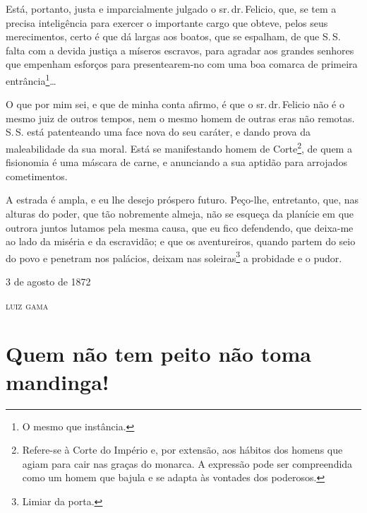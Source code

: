 Está, portanto, justa e imparcialmente julgado o sr.\,dr.\,Felicio, que,
se tem a precisa inteligência para exercer o importante cargo que
obteve, pelos seus merecimentos, certo é que dá largas aos boatos, que
se espalham, de que S.\,S. falta com a devida justiça a míseros escravos,
para agradar aos grandes senhores que empenham esforços para
presentearem-no com uma boa comarca de primeira entrância\footnote{ O
  mesmo que instância.}\ldots{}

O que por mim sei, e que de minha conta afirmo, é que o sr.\,dr.\,Felicio
não é o mesmo juiz de outros tempos, nem o mesmo homem de outras eras
não remotas. S.\,S. está patenteando uma face nova do seu caráter, e
dando prova da maleabilidade da sua moral. Está se manifestando homem de
Corte\footnote{ Refere-se à Corte do Império e, por extensão, aos
  hábitos dos homens que agiam para cair nas graças do monarca. A
  expressão pode ser compreendida como um homem que bajula e se adapta
  às vontades dos poderosos.}, de quem a fisionomia é uma máscara de
carne, e anunciando a sua aptidão para arrojados cometimentos.

A estrada é ampla, e eu lhe desejo próspero futuro. Peço-lhe,
entretanto, que, nas alturas do poder, que tão nobremente almeja, não se
esqueça da planície em que outrora juntos lutamos pela mesma causa, que
eu fico defendendo, que deixa-me ao lado da miséria e da escravidão; e
que os aventureiros, quando partem do seio do povo e penetram nos
palácios, deixam nas soleiras\footnote{ Limiar da porta.} a probidade e
o pudor.

\begin{flushright}
3 de agosto de 1872

\textsc{luiz gama}
\end{flushright}

\part{Quem não tem peito não toma mandinga!}


